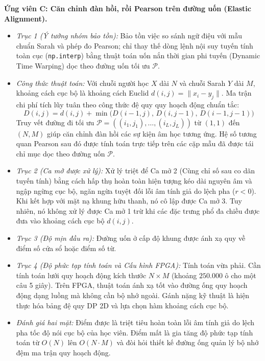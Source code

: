 \documentclass[11pt,a4paper]{article}
\begin{document}
\textbf{Ứng viên C: Căn chỉnh đàn hồi, rồi Pearson trên đường uốn (Elastic Alignment).}
\begin{itemize}
    \item \textit{Trục 1 (Ý tưởng nhóm bảo tồn):} Bảo tồn việc so sánh ngữ điệu với mẫu chuẩn Sarah và phép đo Pearson; chỉ thay thế dòng lệnh nội suy tuyến tính toàn cục (\texttt{np.interp}) bằng thuật toán uốn nắn thời gian phi tuyến (Dynamic Time Warping) dọc theo đường uốn tối ưu $\mathcal{P}$.
    \item \textit{Công thức thuật toán:} Với chuỗi người học $X$ dài $N$ và chuỗi Sarah $Y$ dài $M$, khoảng cách cục bộ là khoảng cách Euclid $d(i, j) = \|x_i - y_j\|$. Ma trận chi phí tích lũy tuân theo công thức đệ quy quy hoạch động chuẩn tắc:
    \begin{equation}
    D(i, j) = d(i, j) + \min\big(D(i-1, j),\, D(i, j-1),\, D(i-1, j-1)\big)
    \label{eq:dtw_recurrence}
    \end{equation}
    Truy vết đường đi tối ưu $\mathcal{P} = ((i_1, j_1), \dots, (i_L, j_L))$ từ $(1, 1)$ đến $(N, M)$ giúp căn chỉnh đàn hồi các sự kiện âm học tương ứng. Hệ số tương quan Pearson sau đó được tính toán trực tiếp trên các cặp mẫu đã được tái chỉ mục dọc theo đường uốn $\mathcal{P}$.
    \item \textit{Trục 2 (Ca mở được xử lý):} Xử lý triệt để Ca mở 2 (Cùng chỉ số sau co dãn tuyến tính) bằng cách hấp thụ hoàn toàn hiện tượng kéo dài nguyên âm và ngập ngừng cục bộ, ngăn ngừa tuyệt đối lỗi âm tính giả do lệch pha ($r < 0$). Khi kết hợp với mặt nạ khung hữu thanh, nó cô lập được Ca mở 3. Tuy nhiên, nó không xử lý được Ca mở 1 trừ khi các đặc trưng phổ đa chiều được đưa vào khoảng cách cục bộ $d(i, j)$.
    \item \textit{Trục 3 (Độ mịn đầu ra):} Đường uốn ở cấp độ khung được ánh xạ quy về điểm số cửa sổ hoặc điểm số từ.
    \item \textit{Trục 4 (Độ phức tạp tính toán và Cấu hình FPGA):} Tính toán vừa phải. Cần tính toán lưới quy hoạch động kích thước $N \times M$ (khoảng $250.000\text{ ô}$ cho một câu 5 giây). Trên FPGA, thuật toán ánh xạ tốt vào đường ống quy hoạch động dạng luồng mà không cần bộ nhớ ngoài. Gánh nặng kỹ thuật là hiện thực hóa bảng đệ quy DP 2D và lựa chọn hàm khoảng cách cục bộ.
    \item \textit{Đánh giá hai mặt:} Điểm được là triệt tiêu hoàn toàn lỗi âm tính giả do lệch pha tốc độ nói cục bộ của học viên. Điểm mất là gia tăng độ phức tạp tính toán từ $O(N)$ lên $O(N \cdot M)$ và đòi hỏi thiết kế đường ống quản lý bộ nhớ đệm ma trận quy hoạch động.
\end{itemize}
\end{document}
